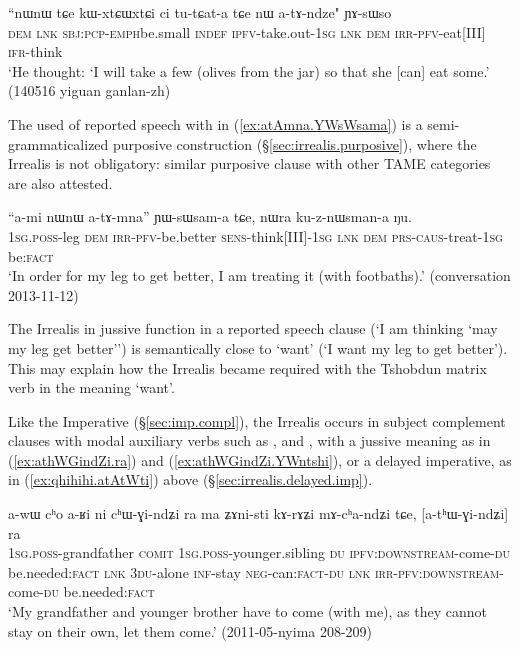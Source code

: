\begin{exe}
\ex \label{ex:atAndze.YAsWso}
\gll ``nɯnɯ tɕe kɯ-xtɕɯ\redp{}xtɕi ci tu-tɕat-a tɕe nɯ a-tɤ-ndze" ɲɤ-sɯso \\
\textsc{dem} \textsc{lnk} \textsc{sbj}:\textsc{pcp}-\textsc{emph}\redp{}be.small \textsc{indef} \textsc{ipfv}-take.out-\textsc{1sg} \textsc{lnk} \textsc{dem} \textsc{irr}-\textsc{pfv}-eat[III] \textsc{ifr}-think \\
\glt `He thought: `I will take a few (olives from the jar) so that she [can] eat some.' (140516 yiguan ganlan-zh)
\end{exe}


The used of reported speech with  in (\ref{ex:atAmna.YWsWsama}) is a semi-grammaticalized purposive construction (§\ref{sec:irrealis.purposive}), where the Irrealis is not obligatory: similar purposive clause with other TAME categories are also attested.

\begin{exe}
\ex \label{ex:atAmna.YWsWsama}
\gll  ``a-mi nɯnɯ a-tɤ-mna'' ɲɯ-sɯsam-a tɕe, nɯra ku-z-nɯsman-a ŋu. \\
\textsc{1sg}.\textsc{poss}-leg \textsc{dem} \textsc{irr}-\textsc{pfv}-be.better \textsc{sens}-think[III]-\textsc{1sg} \textsc{lnk} \textsc{dem} \textsc{prs}-\textsc{caus}-treat-\textsc{1sg} be:\textsc{fact} \\
\glt `In order for my leg to get better, I am treating it (with footbaths).' (conversation 2013-11-12)
\end{exe}

The Irrealis in jussive function in a reported speech clause (`I am thinking `may my leg get better'') is semantically close to `want' (`I want my leg to get better'). This may explain how the Irrealis became required with the Tshobdun matrix verb  in the meaning `want'. 


Like the Imperative (§\ref{sec:imp.compl}), the Irrealis occurs in subject complement clauses with modal auxiliary verbs such as ,  and , with a jussive meaning as in (\ref{ex:athWGindZi.ra}) and (\ref{ex:athWGindZi.YWntshi}), or a delayed imperative, as in (\ref{ex:qhihihi.atAtWti}) above (§\ref{sec:irrealis.delayed.imp}).

\begin{exe}
\ex \label{ex:athWGindZi.ra}
\gll a-wɯ cʰo a-ʁi ni cʰɯ-ɣi-ndʑi ra ma  ʑɤni-sti kɤ-rɤʑi mɤ-cʰa-ndʑi tɕe, [a-tʰɯ-ɣi-ndʑi] ra \\
\textsc{1sg}.\textsc{poss}-grandfather \textsc{comit} \textsc{1sg}.\textsc{poss}-younger.sibling \textsc{du} \textsc{ipfv}:\textsc{downstream}-come-\textsc{du} be.needed:\textsc{fact} \textsc{lnk} \textsc{3du}-alone \textsc{inf}-stay \textsc{neg}-can:\textsc{fact}-\textsc{du} \textsc{lnk} \textsc{irr}-\textsc{pfv}:\textsc{downstream}-come-\textsc{du} be.needed:\textsc{fact} \\
\glt `My grandfather and younger brother have to come (with me), as they cannot stay on their own, let them come.' (2011-05-nyima 208-209)
\end{exe}

